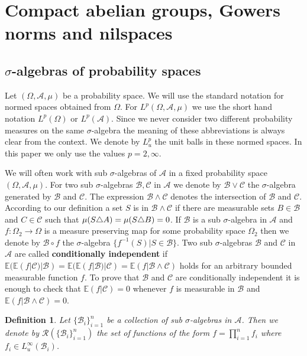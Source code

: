 \documentclass [11pt] {article}
\newtheorem{definition}{Definition}[section]
\def\bm{{\bf \mu}}
\begin{document}
\section{Compact abelian groups, Gowers norms and nilspaces}



\subsection{$\sigma$-algebras of probability spaces}


Let $(\Omega,\mathcal{A},\mu)$ be a probability space. We will use the standard notation for normed spaces obtained from $\Omega$. For $L^p(\Omega,\mathcal{A},\mu)$ we use the short hand notation $L^p(\Omega)$ or $L^p(\mathcal{A})$. Since we never consider two different probability measures on the same $\sigma$-algebra the meaning of these abbreviations is always clear from the context. We denote by $L^p_u$ the unit balls in these normed spaces. In this paper we only use the values $p=2,\infty$. 

We will often work with sub $\sigma$-algebras of $\mathcal{A}$ in a fixed probability space $(\Omega,\mathcal{A},\mu)$. For two sub $\sigma$-algebras $\mathcal{B},\mathcal{C}$ in $\mathcal{A}$ we denote by $\mathcal{B}\vee\mathcal{C}$ the $\sigma$-algebra generated by $\mathcal{B}$ and $\mathcal{C}$. The expression $\mathcal{B}\wedge\mathcal{C}$  denotes the intersection of $\mathcal{B}$ and $\mathcal{C}$. According to our definition a set $S$ is in $\mathcal{B}\wedge\mathcal{C}$ if there are measurable sets $B\in\mathcal{B}$ and $C\in\mathcal{C}$ such that $\bm(S\triangle A)=\bm(S\triangle B)=0$. 
If $\mathcal{B}$ is a sub $\sigma$-algebra in $\mathcal{A}$ and $f:\Omega_2\rightarrow \Omega$ is a measure preserving map for some probability space $\Omega_2$ then we denote by $\mathcal{B}\circ f$ the $\sigma$-algebra $\{f^{-1}(S)|S\in\mathcal{B}\}$.
Two sub $\sigma$-algebras $\mathcal{B}$ and $\mathcal{C}$ in $\mathcal{A}$ are called {\bf conditionally independent} if $\mathbb{E}(\mathbb{E}(f|\mathcal{C})|\mathcal{B})=\mathbb{E}(\mathbb{E}(f|\mathcal{B})|\mathcal{C})=\mathbb{E}(f|\mathcal{B}\wedge\mathcal{C})$ holds for an arbitrary bounded measurable function $f$. To prove that $\mathcal{B}$ and $\mathcal{C}$ are conditionally independent it is enough to check that $\mathbb{E}(f|\mathcal{C})=0$ whenever $f$ is measurable in $\mathcal{B}$ and $\mathbb{E}(f|\mathcal{B}\wedge\mathcal{C})=0$.


\begin{definition} Let $\{\mathcal{B}_i\}_{i=1}^n$ be a collection of sub $\sigma$-algebras in $\mathcal{A}$. Then we denote by $\mathcal{R}(\{\mathcal{B}_i\}_{i=1}^n)$ the set of functions of the form $f=\prod_{i=1}^nf_i$  where $f_i\in L^\infty_u(\mathcal{B}_i)$.
\end{definition}
\end{document}
